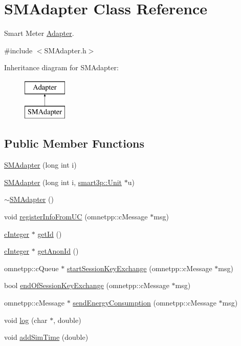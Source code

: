 \hypertarget{classSMAdapter}{}\section{S\+M\+Adapter Class Reference}
\label{classSMAdapter}


Smart Meter \hyperlink{classAdapter}{Adapter}.  




{\ttfamily \#include $<$S\+M\+Adapter.\+h$>$}

Inheritance diagram for S\+M\+Adapter\+:\begin{figure}[H]
\begin{center}
\leavevmode
\includegraphics[height=2.000000cm]{classSMAdapter}
\end{center}
\end{figure}
\subsection*{Public Member Functions}
\begin{DoxyCompactItemize}
\item 
\hyperlink{classSMAdapter_a5bf9ca331e0f7aac7c182ef080ef74eb}{S\+M\+Adapter} (long int i)
\item 
\hyperlink{classSMAdapter_a4f8ec3739e23b40a4b4c3c26490d1c27}{S\+M\+Adapter} (long int i, \hyperlink{classsmart3p_1_1Unit}{smart3p\+::\+Unit} $\ast$u)
\item 
\hyperlink{classSMAdapter_a935746ba8f7210132ac6324efba1c210}{$\sim$\+S\+M\+Adapter} ()
\item 
void \hyperlink{classSMAdapter_ad35493a50872a683b4b5e0671f783769}{register\+Info\+From\+UC} (omnetpp\+::c\+Message $\ast$msg)
\item 
\hyperlink{classcInteger}{c\+Integer} $\ast$ \hyperlink{classSMAdapter_a3568d35fe2de8828cb6fcaf0bd9d9923}{get\+Id} ()
\item 
\hyperlink{classcInteger}{c\+Integer} $\ast$ \hyperlink{classSMAdapter_a586f83c19527bf0401a50424c24eece1}{get\+Anon\+Id} ()
\item 
omnetpp\+::c\+Queue $\ast$ \hyperlink{classSMAdapter_ab4ec874f14fd50ad8c5fc50c500981c4}{start\+Session\+Key\+Exchange} (omnetpp\+::c\+Message $\ast$msg)
\item 
bool \hyperlink{classSMAdapter_adcce474ffc3ad9717b3307ac95fa1445}{end\+Of\+Session\+Key\+Exchange} (omnetpp\+::c\+Message $\ast$msg)
\item 
omnetpp\+::c\+Message $\ast$ \hyperlink{classSMAdapter_a9e36c5113b54f4b1a2a9f0c3fac4dd22}{send\+Energy\+Consumption} (omnetpp\+::c\+Message $\ast$msg)
\item 
void \hyperlink{classSMAdapter_aecfd03fc0facc3c1a9b43cedce2d026a}{log} (char $\ast$, double)
\item 
void \hyperlink{classSMAdapter_a695f8eb90b349dc6267eb82ec9f9ee93}{add\+Sim\+Time} (double)
\end{DoxyCompactItemize}

